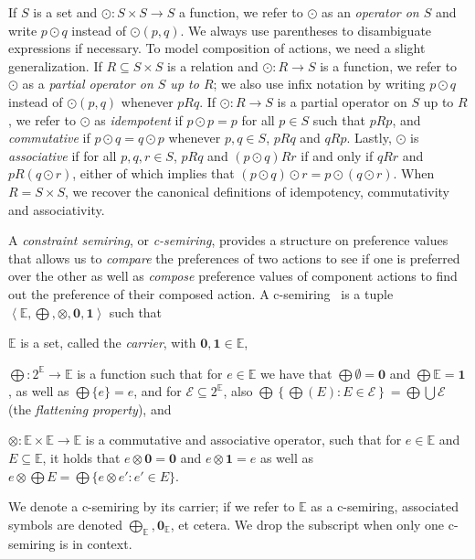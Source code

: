 \documentclass[a4paper]{article}
\newcommand{\angl}[1]{\left\langle#1\right\rangle}
\newcommand{\csbot}{\mathbf{0}}
\newcommand{\cstop}{\mathbf{1}}
\newcommand{\abscsemiring}{\mathbb{E}}
\theoremstyle{definition}
\begin{document}
If $S$ is a set and $\odot: S \times S \to S$ a function, we refer to $\odot$ as an \emph{operator on $S$} and write $p \odot q$ instead of $\odot(p,q)$. We always use parentheses to disambiguate expressions if necessary. To model composition of actions, we need a slight generalization. If $R \subseteq S \times S$ is a relation and $\odot: R \to S$ is a function, we refer to $\odot$ as a \emph{partial operator on $S$ up to $R$}; we also use infix notation by writing $p \odot q$ instead of $\odot(p,q)$ whenever $pRq$. If $\odot: R \to S$ is a partial operator on $S$ up to $R$, we refer to $\odot$ as \emph{idempotent} if $p \odot p = p$ for all $p \in S$ such that $pRp$, and \emph{commutative} if $p \odot q = q \odot p$ whenever $p,q \in S$, $pRq$ and $qRp$. Lastly, $\odot$ is \emph{associative} if for all $p, q, r \in S$, $p R q$ and $(p \odot q) R r$ if and only if $q R r$ and $p R (q \odot r)$, either of which implies that $(p \odot q) \odot r = p \odot (q \odot r)$. When $R = S \times S$, we recover the canonical definitions of idempotency, commutativity and associativity.

A \emph{constraint semiring}, or \emph{c-semiring}, provides a structure on preference values that allows us to \emph{compare} the preferences of two actions to see if one is preferred over the other as well as \emph{compose} preference values of component actions to find out the preference of their composed action. A c-semiring~\cite{bistarelli-montanari-rossi-1995,bistarelli-2004} is a tuple $\angl{\abscsemiring, \bigoplus, \otimes, \csbot, \cstop}$ such that
\begin{inparaenum}[(1)]
    \item $\abscsemiring$ is a set, called the \emph{carrier}, with $\csbot, \cstop \in \abscsemiring$,
    \item $\bigoplus: 2^\abscsemiring \to \abscsemiring$ is a function such that for $e \in \abscsemiring$ we have that $\bigoplus \emptyset = \csbot$ and $\bigoplus \abscsemiring = \cstop$, as well as $\bigoplus \{ e \} = e$, and for $\mathcal{E} \subseteq 2^\abscsemiring$, also $\bigoplus \left\{ \bigoplus(E) : E \in \mathcal{E} \right\} = \bigoplus \bigcup \mathcal{E}$ (the \emph{flattening property}), and
    \item $\otimes: \abscsemiring \times \abscsemiring \to \abscsemiring$ is a commutative and associative operator, such that for $e \in \abscsemiring$ and $E \subseteq \abscsemiring$, it holds that $e \otimes \csbot = \csbot$ and $e \otimes \cstop = e$ as well as $e \otimes \bigoplus E = \bigoplus \{ e \otimes e' : e' \in E \}$.
\end{inparaenum}
We denote a c-semiring by its carrier; if we refer to $\abscsemiring$ as a c-semiring, associated symbols are denoted $\bigoplus_\abscsemiring, \csbot_\abscsemiring$, et cetera. We drop the subscript when only one c-semiring is in context.
\end{document}
